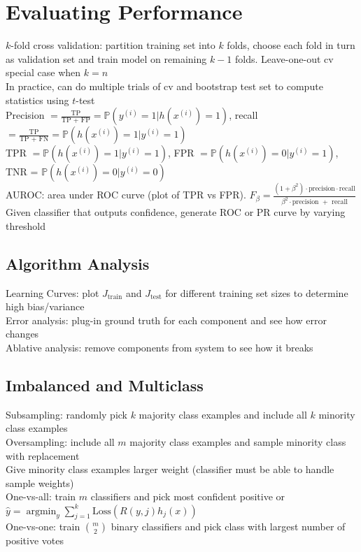 \documentclass{article}
\DeclareMathOperator*{\argmin}{argmin}
\begin{document}
\section{Evaluating Performance}
$k$-fold cross validation: partition training set into $k$ folds, choose each fold in turn as validation set and train model on remaining $k-1$ folds. Leave-one-out cv special case when $k=n$ \\
In practice, can do multiple trials of cv and bootstrap test set to compute statistics using $t$-test \\
Precision $= \frac{\text{TP}}{\text{TP + FP}} = \mathbb{P}(y^{(i)} = 1 | h(x^{(i)}) = 1)$, recall $=\frac{\text{TP}}{\text{TP + FN}} = \mathbb{P}(h(x^{(i)}) = 1 | y^{(i)} = 1)$ \\
TPR $ = \mathbb{P}(h(x^{(i)}) = 1 | y^{(i)} = 1)$, FPR $ = \mathbb{P}(h(x^{(i)}) = 0 | y^{(i)} = 1)$, TNR = $\mathbb{P}(h(x^{(i)}) = 0 | y^{(i)} = 0)$ \\
AUROC: area under ROC curve (plot of TPR vs FPR). $F_\beta = \frac{(1+\beta^2) \cdot \text{precision} \cdot \text{recall} }{\beta^2 \cdot \text{precision } + \text{ recall}}$ \\
Given classifier that outputs confidence, generate ROC or PR curve by varying threshold 

\subsection{Algorithm Analysis}
Learning Curves: plot $J_{\text{train}}$ and $J_{\text{test}}$ for different training set sizes to determine high bias/variance \\
Error analysis: plug-in ground truth for each component and see how error changes \\
Ablative analysis: remove components from system to see how it breaks 

\subsection{Imbalanced and Multiclass}
Subsampling: randomly pick $k$ majority class examples and include all $k$ minority class examples \\
Oversampling: include all $m$ majority class examples and sample minority class with replacement \\
Give minority class examples larger weight (classifier must be able to handle sample weights) \\
One-vs-all: train $m$ classifiers and pick most confident positive or $\hat y = \argmin_y \sum_{j=1}^k \mbox{Loss}(R(y, j)h_j(x))$ \\
One-vs-one: train $m \choose 2$ binary classifiers and pick class with largest number of positive votes 
\end{document}
